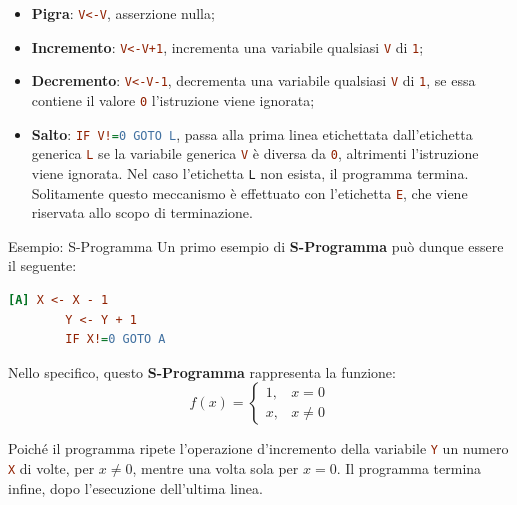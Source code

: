 \begin{itemize}
  \item \textbf{Pigra}: \lstinline[language=ini]{V<-V}, asserzione nulla;
  \item \textbf{Incremento}: \lstinline[language=ini]{V<-V+1}, incrementa una variabile qualsiasi \lstinline[language=ini]{V} di \lstinline[language=ini]{1};
  \item \textbf{Decremento}: \lstinline[language=ini]{V<-V-1}, decrementa una variabile qualsiasi \lstinline[language=ini]{V} di \lstinline[language=ini]{1}, se essa contiene il valore \lstinline[language=ini]{0} l'istruzione viene ignorata;
  \item \textbf{Salto}: \lstinline[language=ini]{IF V!=0 GOTO L}, passa alla prima linea etichettata dall'etichetta generica \lstinline[language=ini]{L} se la variabile generica \lstinline[language=ini]{V} è diversa da \lstinline[language=ini]{0}, altrimenti l'istruzione viene ignorata.
  Nel caso l'etichetta \lstinline{L} non esista, il programma termina. \\
  Solitamente questo meccanismo è effettuato con l'etichetta \lstinline[language=ini]{E}, che viene riservata allo scopo di terminazione.
\end{itemize}

\begin{generalbox}[colframe=azure-gradient-3!90!black]{Esempio: S-Programma}
  Un primo esempio di \textbf{S-Programma} può dunque essere il seguente:
  \begin{lstlisting}[language=ini, label={Primo Esempio S-Programma}, caption=Esempio di S-Programma]
    [A] X <- X - 1
        Y <- Y + 1
        IF X!=0 GOTO A
    \end{lstlisting}

    Nello specifico, questo \textbf{S-Programma} rappresenta la funzione:
    \begin{equation}
      f(x)=\begin{cases}
        1, & x=0\\
        x, & x\neq0
      \end{cases}
      \label{Funzione quasi Identica Eq}
    \end{equation}

    Poiché il programma ripete l'operazione d'incremento della variabile \lstinline[language=ini]{Y} un numero \lstinline[language=ini]{X} di volte, per \(x\neq0\), mentre una volta sola per \(x=0\). Il programma termina infine, dopo l'esecuzione dell'ultima linea.
\end{generalbox}

